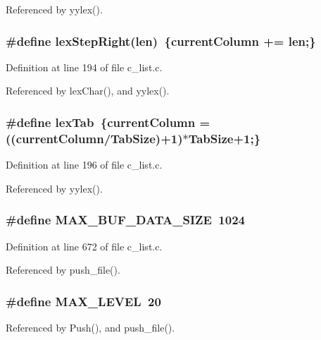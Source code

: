 Referenced by yylex().
\subsubsection{\setlength{\rightskip}{0pt plus 5cm}\#define lex\-Step\-Right(len)~\{\bf{current\-Column} += len;\}}\label{c__list_8c_3a35820247a46c45868044cd21d70884}




Definition at line 194 of file c\_\-list.c.

Referenced by lex\-Char(), and yylex().
\subsubsection{\setlength{\rightskip}{0pt plus 5cm}\#define lex\-Tab~\{\bf{current\-Column} = ((\bf{current\-Column}/Tab\-Size)+1)$\ast$Tab\-Size+1;\}}\label{c__list_8c_c4c70459fefce4815a9170803febe26c}




Definition at line 196 of file c\_\-list.c.

Referenced by yylex().
\subsubsection{\setlength{\rightskip}{0pt plus 5cm}\#define MAX\_\-BUF\_\-DATA\_\-SIZE~1024}\label{c__list_8c_e13d7ac34087cea7929eb077638bdd73}




Definition at line 672 of file c\_\-list.c.

Referenced by push\_\-file().
\subsubsection{\setlength{\rightskip}{0pt plus 5cm}\#define MAX\_\-LEVEL~20}\label{c__list_8c_5bb4257ca9fa4bfcf9391b7895b97761}




Referenced by Push(), and push\_\-file().
